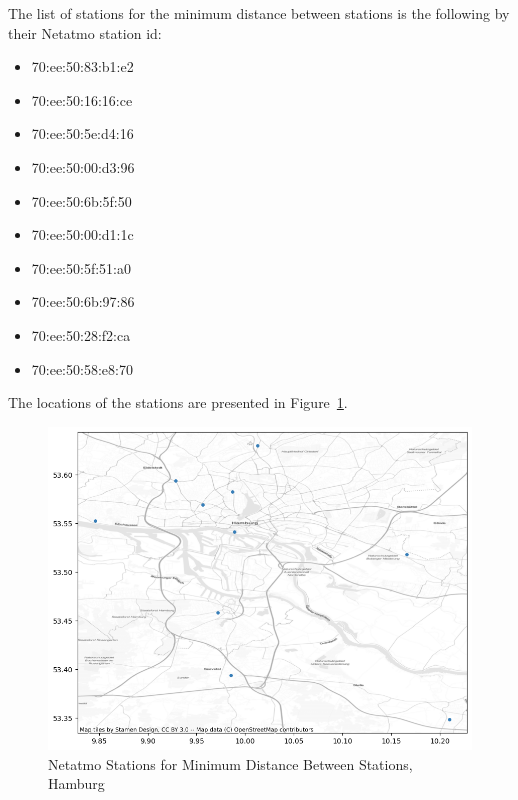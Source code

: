 The list of stations for the minimum distance between stations is the following by their Netatmo station id:

\begin{itemize}
    \item 70:ee:50:83:b1:e2 
    \item 70:ee:50:16:16:ce
    \item 70:ee:50:5e:d4:16
    \item 70:ee:50:00:d3:96
    \item 70:ee:50:6b:5f:50
    \item 70:ee:50:00:d1:1c
    \item 70:ee:50:5f:51:a0
    \item 70:ee:50:6b:97:86
    \item 70:ee:50:28:f2:ca
    \item 70:ee:50:58:e8:70
\end{itemize}

The locations of the stations are presented in Figure~\ref{fig:eval_hamburg_locations_point_histb_10_map}.

\begin{figure}[ht]
    \centering
    \includegraphics[width=1\textwidth]{images/eval_hamburg_locations_point_histb_10_map.png}
    \caption{Netatmo Stations for Minimum Distance Between Stations, Hamburg}
    \label{fig:eval_hamburg_locations_point_histb_10_map}
\end{figure}
